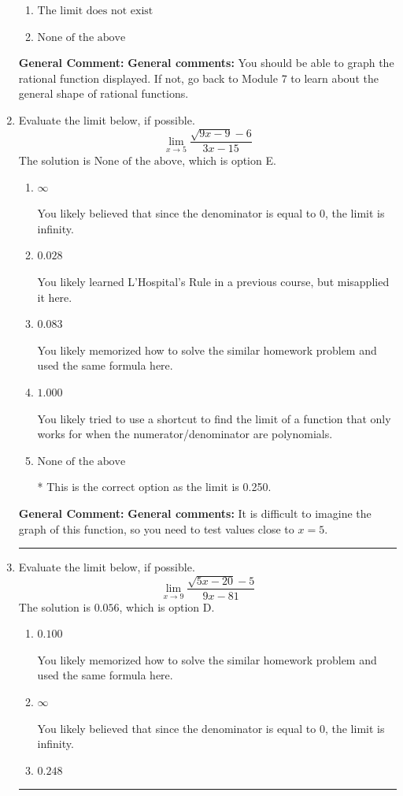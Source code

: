 \documentclass{extbook}[14pt]
\newcommand{\litem}[1]{\item #1

\rule{\textwidth}{0.4pt}}
\begin{document}
\begin{enumerate}
{\begin{enumerate}[label=\Alph*.]
\item \( \text{The limit does not exist} \)


\item \( \text{None of the above} \)


\end{enumerate}

\textbf{General Comment:} \textbf{General comments:} You should be able to graph the rational function displayed. If not, go back to Module 7 to learn about the general shape of rational functions.
}
\litem{
Evaluate the limit below, if possible.
\[ \lim_{x \rightarrow 5} \frac{\sqrt{9x - 9} - 6}{3x - 15} \]The solution is \( \text{None of the above} \), which is option E.\begin{enumerate}[label=\Alph*.]
\item \( \infty \)

You likely believed that since the denominator is equal to 0, the limit is infinity.
\item \( 0.028 \)

You likely learned L'Hospital's Rule in a previous course, but misapplied it here.
\item \( 0.083 \)

You likely memorized how to solve the similar homework problem and used the same formula here.
\item \( 1.000 \)

You likely tried to use a shortcut to find the limit of a function that only works for when the numerator/denominator are polynomials.
\item \( \text{None of the above} \)

* This is the correct option as the limit is 0.250.
\end{enumerate}

\textbf{General Comment:} \textbf{General comments:} It is difficult to imagine the graph of this function, so you need to test values close to $x = 5$.
}
\litem{
Evaluate the limit below, if possible.
\[ \lim_{x \rightarrow 9} \frac{\sqrt{5x - 20} - 5}{9x - 81} \]The solution is \( 0.056 \), which is option D.\begin{enumerate}[label=\Alph*.]
\item \( 0.100 \)

You likely memorized how to solve the similar homework problem and used the same formula here.
\item \( \infty \)

You likely believed that since the denominator is equal to 0, the limit is infinity.
\item \( 0.248 \)


\end{enumerate}}
\end{enumerate}
\end{document}
